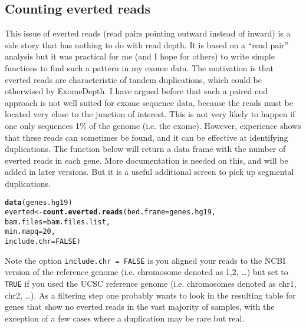 \documentclass[10pt]{article}\usepackage[]{graphicx}\usepackage[]{color}
\makeatletter
\newcommand{\hlnum}[1]{\textcolor[rgb]{0.686,0.059,0.569}{#1}}%
\newcommand{\hlstd}[1]{\textcolor[rgb]{0.345,0.345,0.345}{#1}}%
\newcommand{\hlkwb}[1]{\textcolor[rgb]{0.69,0.353,0.396}{#1}}%
\newcommand{\hlkwc}[1]{\textcolor[rgb]{0.333,0.667,0.333}{#1}}%
\newcommand{\hlkwd}[1]{\textcolor[rgb]{0.737,0.353,0.396}{\textbf{#1}}}%
\newenvironment{kframe}{%
 \def\at@end@of@kframe{}%
 \ifinner\ifhmode%
  \def\at@end@of@kframe{\end{minipage}}%
  \begin{minipage}{\columnwidth}%
 \fi\fi%
 \def\FrameCommand##1{\hskip\@totalleftmargin \hskip-\fboxsep
 \colorbox{shadecolor}{##1}\hskip-\fboxsep
     \hskip-\linewidth \hskip-\@totalleftmargin \hskip\columnwidth}%
 \MakeFramed {\advance\hsize-\width
   \@totalleftmargin\z@ \linewidth\hsize
   \@setminipage}}%
 {\par\unskip\endMakeFramed%
 \at@end@of@kframe}
\newenvironment{knitrout}{}{} %
\makeatother
\begin{document}
\subsection{Counting everted reads}

This issue of everted reads (read pairs pointing outward instead of inward) is a side story that has nothing to do with read depth.
It is based on a ``read pair'' analysis but it was practical for me (and I hope for others) to write simple functions to find such a pattern in my exome data.
The motivation is that everted reads are characteristic of tandem duplications, which could be otherwised by ExomeDepth.
I have argued before that such a paired end approach is not well suited for exome sequence data, because the reads must be located very close to the junction of interest.
This is not very likely to happen if one only sequences 1\% of the genome (i.e. the exome).
However, experience shows that these reads can sometimes be found, and it can be effective at identifying duplications.
The function below will return a data frame with the number of everted reads in each gene.
More documentation is needed on this, and will be added in later versions.
But it is a useful additional screen to pick up segmental duplications.

\begin{knitrout}
\color{fgcolor}\begin{kframe}
\begin{alltt}
\hlkwd{data}\hlstd{(genes.hg19)}
\hlstd{everted} \hlkwb{<-} \hlkwd{count.everted.reads} \hlstd{(}\hlkwc{bed.frame} \hlstd{= genes.hg19,}
                               \hlkwc{bam.files} \hlstd{= bam.files.list,}
                               \hlkwc{min.mapq} \hlstd{=} \hlnum{20}\hlstd{,}
                               \hlkwc{include.chr} \hlstd{=} \hlnum{FALSE}\hlstd{)}
\end{alltt}
\end{kframe}
\end{knitrout}

Note the option \texttt{include.chr = FALSE} is you aligned your reads to the NCBI version of the reference genome (i.e. chromosome denoted as 1,2, \dots) but set to \texttt{TRUE} if you used the UCSC reference genome (i.e. chromosomes denoted as chr1, chr2, \dots). As a filtering step one probably wants to look in the resulting table for genes that show no everted reads in the vast majority of samples, with the exception of a few cases where a duplication may be rare but real.
\end{document}
